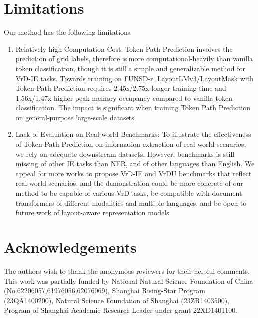 \documentclass[11pt]{article}
\begin{document}
\section*{Limitations}

Our method has the following limitations: 

\begin{enumerate}[leftmargin=*,noitemsep,topsep=0pt]
    \item Relatively-high Computation Cost: 
    Token Path Prediction involves the prediction of grid labels, therefore is more computational-heavily than vanilla token classification, though it is still a simple and generalizable method for VrD-IE tasks. 
    Towards training on FUNSD-r, LayoutLMv3/LayoutMask with Token Path Prediction requires 2.45x/2.75x longer training time and 1.56x/1.47x higher peak memory occupancy compared to vanilla token classification.
    The impact is significant when training Token Path Prediction on general-purpose large-scale datasets.
    \item Lack of Evaluation on Real-world Benchmarks: 
    To illustrate the effectiveness of Token Path Prediction on information extraction of real-world scenarios, we rely on adequate downstream datasets. 
    However, benchmarks is still missing of other IE tasks than NER, and of other languages than English. 
    We appeal for more works to propose VrD-IE and VrDU benchmarks that reflect real-world scenarios, and the demonstration could be more concrete 
    of our method to 
    be capable of various VrD tasks, 
    be compatible with document transformers of different modalities and multiple languages, 
    and be open to future work of layout-aware representation models. 
\end{enumerate}


\section*{Acknowledgements}

The authors wish to thank the anonymous reviewers for their helpful comments. This work was partially funded by National Natural Science Foundation of China (No.62206057,61976056,62076069), Shanghai Rising-Star Program (23QA1400200), Natural Science Foundation of Shanghai (23ZR1403500), Program of Shanghai Academic Research Leader under grant 22XD1401100.




\newpage
\end{document}
